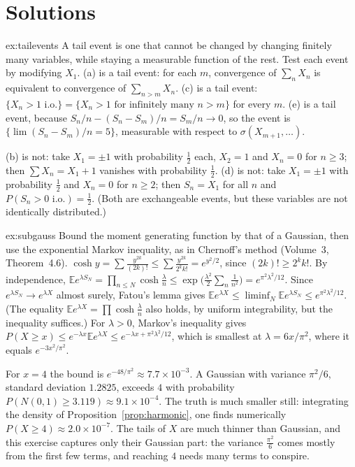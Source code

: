 \section{Solutions}

\begin{solution}{ex:tailevents}
\idea A tail event is one that cannot be changed by changing finitely many variables, while staying a measurable function of the rest.
Test each event by modifying $X_1$.
\writeup (a) is a tail event: for each $m$, convergence of $\sum_nX_n$ is equivalent to convergence of $\sum_{n>m}X_n$. (c) is a tail
event: $\{X_n>1\text{ i.o.}\}=\{X_n>1\text{ for infinitely many }n>m\}$ for every $m$. (e) is a tail event, because $S_n/n-(S_n-S_m)/n=
S_m/n\to0$, so the event is $\{\lim(S_n-S_m)/n=5\}$, measurable with respect to $\sigma(X_{m+1},\dots)$.

(b) is not: take $X_1=\pm1$ with probability $\frac12$ each, $X_2=1$ and $X_n=0$ for $n\ge3$; then $\sum X_n=X_1+1$ vanishes with
probability $\frac12$. (d) is not: take $X_1=\pm1$ with probability $\frac12$ and $X_n=0$ for $n\ge2$; then $S_n=X_1$ for all $n$ and
$P(S_n>0\text{ i.o.})=\frac12$. (Both are exchangeable events, but these variables are not identically distributed.)
\end{solution}

\begin{solution}{ex:subgauss}
\idea Bound the moment generating function by that of a Gaussian, then use the exponential Markov inequality, as in Chernoff's method
(Volume~3, Theorem~4.6).
\writeup $\cosh y=\sum\frac{y^{2k}}{(2k)!}\le\sum\frac{y^{2k}}{2^kk!}=e^{y^2/2}$, since $(2k)!\ge2^kk!$. By independence,
$\mathbb E e^{\lambda S_N}=\prod_{n\le N}\cosh\frac\lambda n\le\exp\bigl(\frac{\lambda^2}2\sum_n\frac1{n^2}\bigr)=e^{\pi^2\lambda^2/12}$. Since
$e^{\lambda S_N}\to e^{\lambda X}$ almost surely, Fatou's lemma gives $\mathbb E e^{\lambda X}\le\liminf_N\mathbb E e^{\lambda S_N}\le e^{\pi^2\lambda^2/12}$.
(The equality $\mathbb E e^{\lambda X}=\prod\cosh\frac\lambda n$ also holds, by uniform integrability, but the inequality suffices.) For $\lambda>0$,
Markov's inequality gives $P(X\ge x)\le e^{-\lambda x}\mathbb E e^{\lambda X}\le e^{-\lambda x+\pi^2\lambda^2/12}$, which is smallest at $\lambda=6x/\pi^2$,
where it equals $e^{-3x^2/\pi^2}$.

For $x=4$ the bound is $e^{-48/\pi^2}\approx7.7\times10^{-3}$. A Gaussian with variance $\pi^2/6$, standard deviation $1.2825$, exceeds $4$ with
probability $P(N(0,1)\ge3.119)\approx9.1\times10^{-4}$. The truth is much smaller still: integrating the density of Proposition~\ref{prop:harmonic},
one finds numerically $P(X\ge4)\approx2.0\times10^{-7}$. The tails of $X$ are much thinner than Gaussian, and this exercise captures only their
Gaussian part: the variance $\frac{\pi^2}6$ comes mostly from the first few terms, and reaching $4$ needs many terms to conspire.
\end{solution}

